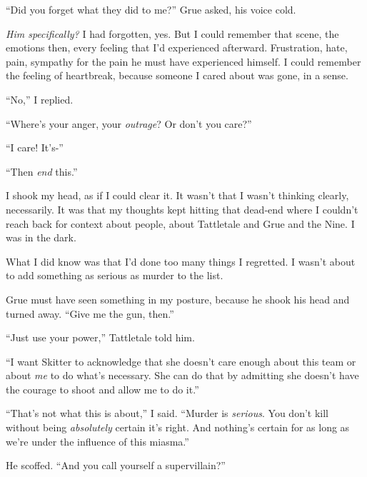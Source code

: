 ``Did you forget what they did to me?''  Grue asked, his voice cold.



\emph{Him specifically?  }I had forgotten, yes.\emph{  }But I could remember that scene, the emotions then, every feeling that I'd experienced afterward.  Frustration, hate, pain, sympathy for the pain he must have experienced himself.  I could remember the feeling of heartbreak, because someone I cared about was gone, in a sense.



``No,'' I replied.



``Where's your anger, your \emph{outrage}?  Or don't you care?''



``I care!  It's-''



``Then \emph{end} this.''



I shook my head, as if I could clear it.  It wasn't that I wasn't thinking clearly, necessarily.  It was that my thoughts kept hitting that dead-end where I couldn't reach back for context about people, about Tattletale and Grue and the Nine.  I was in the dark.



What I did know was that I'd done too many things I regretted.  I wasn't about to add something as serious as murder to the list.



Grue must have seen something in my posture, because he shook his head and turned away.  ``Give me the gun, then.''



``Just use your power,'' Tattletale told him.



``I want Skitter to acknowledge that she doesn't care enough about this team or about \emph{me} to do what's necessary.  She can do that by admitting she doesn't have the courage to shoot and allow me to do it.''



``That's not what this is about,'' I said.  ``Murder is \emph{serious}.  You don't kill without being \emph{absolutely} certain it's right.  And nothing's certain for as long as we're under the influence of this miasma.''



He scoffed.  ``And you call yourself a supervillain?''



